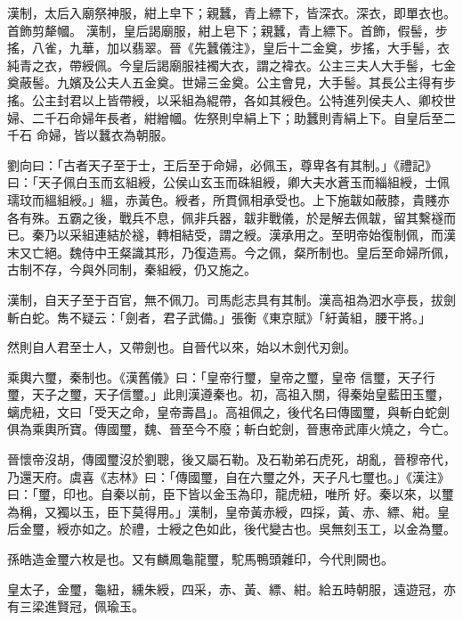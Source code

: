 \begin{pinyinscope}
 漢制，太后入廟祭神服，紺上皁下；親蠶，青上縹下，皆深衣。深衣，即單衣也。首飾剪犛幗。
 漢制，皇后謁廟服，紺上皂下；親蠶，青上縹下。首飾，假髻，步搖，八雀，九華，加以翡翠。晉《先蠶儀注》，皇后十二金奠，步搖，大手髻，衣純青之衣，帶綬佩。今皇后謁廟服袿襡大衣，謂之褘衣。公主三夫人大手髻，七金奠蔽髻。九嬪及公夫人五金奠。世婦三金奠。公主會見，大手髻。其長公主得有步搖。公主封君以上皆帶綬，以采組為緄帶，各如其綬色。公特進列侯夫人、卿校世婦、二千石命婦年長者，紺繒幗。佐祭則皁絹上下；助蠶則青絹上下。自皇后至二千石
 命婦，皆以蠶衣為朝服。



 劉向曰：「古者天子至于士，王后至于命婦，必佩玉，尊卑各有其制。」《禮記》曰：「天子佩白玉而玄組綬，公侯山玄玉而硃組綬，卿大夫水蒼玉而緇組綬，士佩瓀玟而縕組綬。」縕，赤黃色。綬者，所貫佩相承受也。上下施韍如蔽膝，貴賤亦各有殊。五霸之後，戰兵不息，佩非兵器，韍非戰儀，於是解去佩韍，留其繫襚而已。秦乃以采組連結於襚，轉相結受，謂之綬。漢承用之。至明帝始復制佩，而漢
 末又亡絕。魏侍中王粲識其形，乃復造焉。今之佩，粲所制也。皇后至命婦所佩，古制不存，今與外同制，秦組綬，仍又施之。



 漢制，自天子至于百官，無不佩刀。司馬彪志具有其制。漢高祖為泗水亭長，拔劍斬白蛇。雋不疑云：「劍者，君子武備。」張衡《東京賦》「紆黃組，腰干將。」



 然則自人君至士人，又帶劍也。自晉代以來，始以木劍代刃劍。



 乘輿六璽，秦制也。《漢舊儀》曰：「皇帝行璽，皇帝之璽，皇帝
 信璽，天子行璽，天子之璽，天子信璽。」此則漢遵秦也。初，高祖入關，得秦始皇藍田玉璽，螭虎紐，文曰「受天之命，皇帝壽昌」。高祖佩之，後代名曰傳國璽，與斬白蛇劍俱為乘輿所寶。傳國璽，魏、晉至今不廢；斬白蛇劍，晉惠帝武庫火燒之，今亡。



 晉懷帝沒胡，傳國璽沒於劉聰，後又屬石勒。及石勒弟石虎死，胡亂，晉穆帝代，乃還天府。虞喜《志林》曰：「傳國璽，自在六璽之外，天子凡七璽也。」《漢注》曰：「璽，印也。自秦以前，臣下皆以金玉為印，龍虎紐，唯所
 好。秦以來，以璽為稱，又獨以玉，臣下莫得用。」漢制，皇帝黃赤綬，四採，黃、赤、縹、紺。皇后金璽，綬亦如之。於禮，士綬之色如此，後代變古也。吳無刻玉工，以金為璽。



 孫皓造金璽六枚是也。又有麟鳳龜龍璽，駝馬鴨頭雜印，今代則闕也。



 皇太子，金璽，龜紐，纁朱綬，四采，赤、黃、縹、紺。給五時朝服，遠遊冠，亦有三梁進賢冠，佩瑜玉。




\end{pinyinscope}
